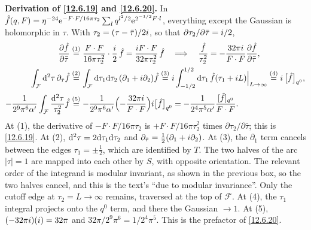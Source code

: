 \begin{tcolorbox}[breakable]
	\begin{remark}
		\textbf{Derivation of \eqref{12.6.19} and \eqref{12.6.20}.} In $\hat f(q,F)=\eta^{-24}\mathrm{e}^{-F\cdot F/16\pi\tau_{2}}\sum_{l}q^{l^{2}/2}\mathrm{e}^{2^{-1/2}F\cdot l}$, everything except the Gaussian is holomorphic in $\tau$. With $\tau_{2}=(\tau-\bar\tau)/2i$, so that $\partial\tau_{2}/\partial\bar\tau=i/2$,
		\begin{align*}
			\frac{\partial\hat f}{\partial\bar\tau}&\overset{(1)}{=} \frac{F\cdot F}{16\pi\tau_{2}^{2}}\cdot\frac{i}{2}\,\hat f=\frac{i F\cdot F}{32\pi\tau_{2}^{2}}\,\hat f
			\quad\Longrightarrow\quad \frac{\hat f}{\tau_{2}^{2}}=-\frac{32\pi i}{F\cdot F}\frac{\partial\hat f}{\partial\bar\tau} ,\\
			\int_{\mathcal F}\mathrm{d}^{2}\tau\,\partial_{\bar\tau}\hat f
			&\overset{(2)}{=} \int_{\mathcal F}\mathrm{d}\tau_{1}\mathrm{d}\tau_{2}\,(\partial_{1}+i\partial_{2})\hat f
			\overset{(3)}{=} i\int_{-1/2}^{1/2}\mathrm{d}\tau_{1}\,\hat f(\tau_{1}+i L)\Big|_{L\to\infty}
			\overset{(4)}{=} i\,\bigl[\hat f\bigr]_{q^{0}} ,\\
			-\frac{1}{2^{9}\pi^{6}\alpha'}\int_{\mathcal F}\frac{\mathrm{d}^{2}\tau}{\tau_{2}^{2}}\hat f
			&\overset{(5)}{=} -\frac{1}{2^{9}\pi^{6}\alpha'}\Bigl(-\frac{32\pi i}{F\cdot F}\Bigr)i\bigl[\hat f\bigr]_{q^{0}}
			=-\frac{1}{2^{4}\pi^{5}\alpha'}\frac{[\hat f]_{q^{0}}}{F\cdot F} .
		\end{align*}
		At (1), the derivative of $-F\cdot F/16\pi\tau_{2}$ is $+F\cdot F/16\pi\tau_{2}^{2}$ times $\partial\tau_{2}/\partial\bar\tau$; this is \eqref{12.6.19}. At (2), $\mathrm{d}^{2}\tau=2\mathrm{d}\tau_{1}\mathrm{d}\tau_{2}$ and $\partial_{\bar\tau}=\frac12(\partial_{1}+i\partial_{2})$. At (3), the $\partial_{1}$ term cancels between the edges $\tau_{1}=\pm\frac12$, which are identified by $T$. The two halves of the arc $|\tau|=1$ are mapped into each other by $S$, with opposite orientation. The relevant order of the integrand is modular invariant, as shown in the previous box, so the two halves cancel, and this is the text's ``due to modular invariance''. Only the cutoff edge at $\tau_{2}=L\to\infty$ remains, traversed at the top of $\mathcal F$. At (4), the $\tau_{1}$ integral projects onto the $q^{0}$ term, and there the Gaussian $\to1$. At (5), $(-32\pi i)(i)=32\pi$ and $32\pi/2^{9}\pi^{6}=1/2^{4}\pi^{5}$. This is the prefactor of \eqref{12.6.20}.
	\end{remark}
\end{tcolorbox}

